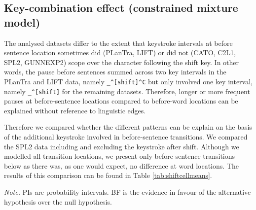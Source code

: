 \clearpage
\makeatletter
\efloat@restorefloats
\makeatother


\begin{appendix}
\section{}
\hypertarget{key-combination-effect-constrained-mixture-model}{%
\subsection{Key-combination effect (constrained mixture
model)}\label{key-combination-effect-constrained-mixture-model}}

The analysed datasets differ to the extent that keystroke intervals at
before sentence location sometimes did (PLanTra, LIFT) or did not (CATO,
C2L1, SPL2, GUNNEXP2) scope over the character following the shift key.
In other words, the pause before sentences summed across two key
intervals in the PLanTra and LIFT data, namely
\texttt{\_\^{}{[}shift{]}\^{}C} but only involved one key interval,
namely \texttt{\_\^{}{[}shift{]}} for the remaining datasets. Therefore,
longer or more frequent pauses at before-sentence locations compared to
before-word locations can be explained without reference to linguistic
edges.

Therefore we compared whether the different patterns can be explain on
the basis of the additional keystroke involved in before-sentence
transitions. We compared the SPL2 data including and excluding the
keystroke after shift. Although we modelled all transition locations, we
present only before-sentence transitions below as there was, as one
would expect, no difference at word locations. The results of this
comparison can be found in Table \ref{tab:shiftcellmeans}.

\begin{center}
\begin{ThreePartTable}

\begin{TableNotes}[para]
\normalsize{\textit{Note.} PIs are probability intervals. BF is the evidence in favour of the alternative hypothesis over the null hypothesis.}
\end{TableNotes}

\footnotesize{

}
\end{ThreePartTable}
\end{center}
\end{appendix}
